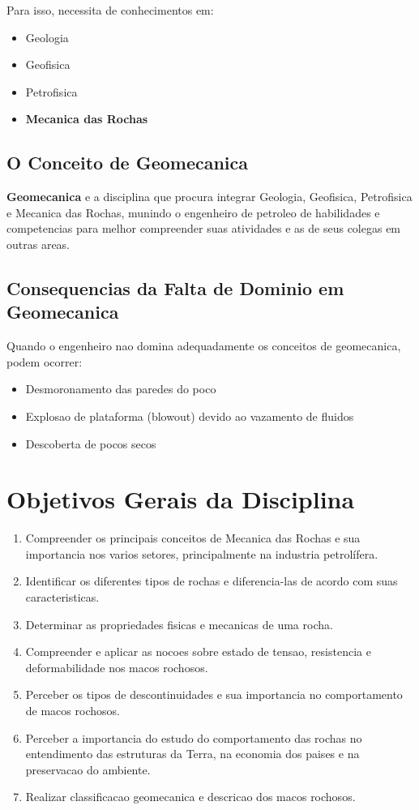 \documentclass[12pt,a4paper,twoside]{book}
\begin{document}
Para isso, necessita de conhecimentos em:
\begin{itemize}
    \item Geologia
    \item Geofisica
    \item Petrofisica
    \item \textbf{Mecanica das Rochas}
\end{itemize}

\subsection{O Conceito de Geomecanica}

\textbf{Geomecanica} e a disciplina que procura integrar Geologia, Geofisica, Petrofisica e 
Mecanica das Rochas, munindo o engenheiro de petroleo de habilidades e competencias para melhor 
compreender suas atividades e as de seus colegas em outras areas.

\subsection{Consequencias da Falta de Dominio em Geomecanica}

Quando o engenheiro nao domina adequadamente os conceitos de geomecanica, podem ocorrer:
\begin{itemize}
    \item Desmoronamento das paredes do poco
    \item Explosao de plataforma (blowout) devido ao vazamento de fluidos
    \item Descoberta de pocos secos
\end{itemize}

\section{Objetivos Gerais da Disciplina}

\begin{enumerate}
    \item Compreender os principais conceitos de Mecanica das Rochas e sua importancia nos varios 
    setores, principalmente na industria petrolífera.
    \item Identificar os diferentes tipos de rochas e diferencia-las de acordo com suas caracteristicas.
    \item Determinar as propriedades fisicas e mecanicas de uma rocha.
    \item Compreender e aplicar as nocoes sobre estado de tensao, resistencia e deformabilidade 
    nos macos rochosos.
    \item Perceber os tipos de descontinuidades e sua importancia no comportamento de macos rochosos.
    \item Perceber a importancia do estudo do comportamento das rochas no entendimento das estruturas 
    da Terra, na economia dos paises e na preservacao do ambiente.
    \item Realizar classificacao geomecanica e descricao dos macos rochosos.
\end{enumerate}
\end{document}
